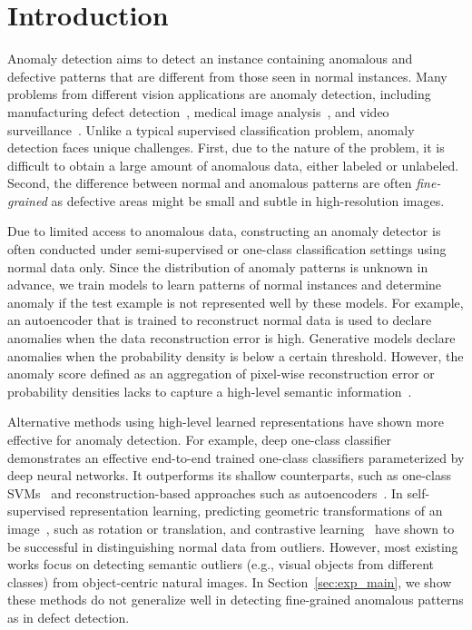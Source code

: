 \documentclass[final]{cvpr}
\begin{document}
\vspace{-0.1in}
\section{Introduction}
\label{sec:intro}
\vspace{-0.05in}

Anomaly detection aims to detect an instance containing anomalous and defective patterns that are different from those seen in normal instances. Many problems from different vision applications are anomaly detection, including manufacturing defect detection~\cite{carrera2015detecting,bergmann2019mvtec}, medical image analysis~\cite{seebock2016identifying,schlegl2017unsupervised}, and video surveillance~\cite{adam2008robust,liu2018classifier,sultani2018real}. Unlike a typical supervised classification problem, anomaly detection faces unique challenges. First, due to the nature of the problem, it is difficult to obtain a large amount of anomalous data, either labeled or unlabeled. Second, the difference between normal and anomalous patterns are often \emph{fine-grained} as defective areas might be small and subtle in high-resolution images.

Due to limited access to anomalous data, constructing an anomaly detector is often conducted under semi-supervised or one-class classification settings using normal data only. Since the distribution of anomaly patterns is unknown in advance, we train models to learn patterns of normal instances and determine anomaly if the test example is not represented well by these models. For example, an autoencoder that is trained to reconstruct normal data is used to declare anomalies when the data reconstruction error is high. Generative models
declare anomalies when the probability density is below a certain threshold. However, the anomaly score defined as an aggregation of pixel-wise reconstruction error or probability densities lacks to capture a high-level semantic information~\cite{ren2019likelihood,nalisnick2019detecting}.


Alternative methods using high-level learned representations have shown more effective for anomaly detection. For example, deep one-class classifier~\cite{ruff2018deep} demonstrates an effective  end-to-end trained one-class classifiers parameterized by deep neural networks. It outperforms its shallow counterparts, such as one-class SVMs~\cite{scholkopf2000support} and reconstruction-based approaches such as autoencoders~\cite{masci2011stacked}. In self-supervised representation learning, predicting geometric transformations of an image~\cite{golan2018deep,hendrycks2019using,bergman2020classification}, such as rotation or translation, and contrastive learning~\cite{tack2020csi,sohn2020learning} have shown to be successful in distinguishing normal data from outliers. However, most existing works focus on detecting semantic outliers (e.g., visual objects from different classes) from object-centric natural images. In Section~\ref{sec:exp_main}, we show these methods do not generalize well in detecting fine-grained anomalous patterns as in defect detection.
\end{document}
